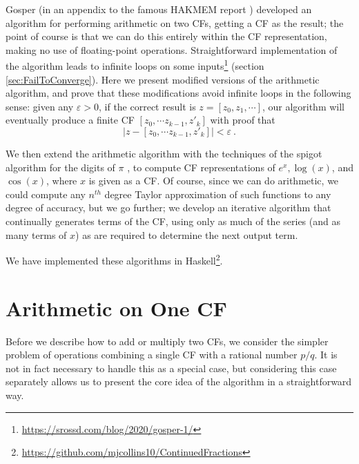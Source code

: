 \documentclass[11pt, oneside]{amsart}   	%
\renewcommand{\:}{\negthickspace:\negthickspace}
\begin{document}
Gosper (in an appendix to the famous HAKMEM report \cite{hakmem}) 
developed an algorithm for performing arithmetic on two CFs, getting a CF as the result;
the point of course is that we can do this entirely within the CF representation, making no use of floating-point operations. Straightforward implementation of the algorithm leads to infinite loops on some inputs\footnote{\href{https://srossd.com/blog/2020/gosper-1/}{https://srossd.com/blog/2020/gosper-1/}} (section \ref{sec:FailToConverge}).
Here we present modified versions of the arithmetic algorithm, and prove that these modifications avoid infinite loops in the following sense: given any $\varepsilon > 0$, if the correct result is $z=[z_0,z_1,\cdots]$, our algorithm will eventually produce a finite CF $[z_0, \cdots z_{k-1}, z'_k]$ with proof that 
\[
|z - [z_0, \cdots z_{k-1}, z'_k]| < \varepsilon\ .
\]

We then extend the arithmetic algorithm with the techniques of the spigot algorithm for the digits of $\pi$ \cite{Gibbons2016,Rabinowitz2016}, to compute CF representations of $e^x, \log(x)$, and  $\cos(x)$, where $x$ is given as a CF. 
Of course, since we can do arithmetic, we could compute any $n^{th}$ degree Taylor approximation of such functions to any degree of accuracy, but we go further;
we develop an iterative algorithm that continually generates terms of the CF, using only as much of the series (and as many terms of $x$) as are required to determine the next output term.

We have implemented these algorithms
in Haskell\footnote{\href{https://github.com/mjcollins10/ContinuedFractions}{https://github.com/mjcollins10/ContinuedFractions}}.


\section{Arithmetic on One CF}
Before we describe how to add or multiply two CFs, we consider the simpler problem of operations combining a single CF with a
rational number $p/q$. It is not in fact necessary to handle this as a special case, but considering this case separately allows us to present the core idea of the algorithm in a straightforward way.
\end{document}
